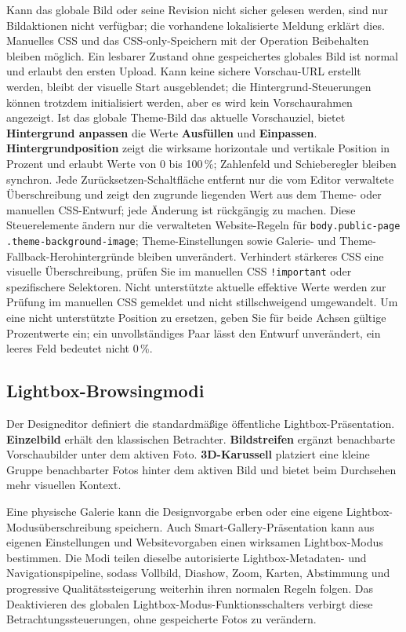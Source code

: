 \documentclass[11pt,a4paper]{article}
\newcommand{\ui}[1]{\textbf{#1}}
\newcommand{\codeword}[1]{\nolinkurl{#1}}
\begin{document}
Kann das globale Bild oder seine Revision nicht sicher gelesen werden, sind nur
Bildaktionen nicht verfügbar; die vorhandene lokalisierte Meldung erklärt dies.
Manuelles CSS und das CSS-only-Speichern mit der Operation Beibehalten bleiben
möglich. Ein lesbarer Zustand ohne gespeichertes globales Bild ist normal und
erlaubt den ersten Upload. Kann keine sichere Vorschau-URL erstellt werden,
bleibt der visuelle Start ausgeblendet; die Hintergrund-Steuerungen können
trotzdem initialisiert werden, aber es wird kein Vorschaurahmen angezeigt.
Ist das globale Theme-Bild das aktuelle Vorschauziel, bietet \ui{Hintergrund
anpassen} die Werte \ui{Ausfüllen} und \ui{Einpassen}. \ui{Hintergrundposition}
zeigt die wirksame horizontale und vertikale Position in Prozent und erlaubt
Werte von 0 bis 100\,\%; Zahlenfeld und Schieberegler bleiben synchron. Jede
Zurücksetzen-Schaltfläche entfernt nur die vom Editor verwaltete Überschreibung
und zeigt den zugrunde liegenden Wert aus dem Theme- oder manuellen CSS-Entwurf;
jede Änderung ist rückgängig zu machen. Diese Steuerelemente ändern nur die
verwalteten Website-Regeln für
\codeword{body.public-page .theme-background-image}; Theme-Einstellungen sowie
Galerie- und Theme-Fallback-Herohintergründe bleiben unverändert. Verhindert
stärkeres CSS eine visuelle Überschreibung, prüfen Sie im manuellen CSS
\codeword{!important} oder spezifischere Selektoren. Nicht unterstützte aktuelle
effektive Werte werden zur Prüfung im manuellen CSS gemeldet und nicht
stillschweigend umgewandelt. Um eine nicht unterstützte Position zu ersetzen,
geben Sie für beide Achsen gültige Prozentwerte ein; ein unvollständiges Paar
lässt den Entwurf unverändert, ein leeres Feld bedeutet nicht 0\,\%.
\subsection{Lightbox-Browsingmodi}

Der Designeditor definiert die standardmäßige öffentliche Lightbox-Präsentation.
\ui{Einzelbild} erhält den klassischen Betrachter. \ui{Bildstreifen} ergänzt
benachbarte Vorschaubilder unter dem aktiven Foto. \ui{3D-Karussell} platziert
eine kleine Gruppe benachbarter Fotos hinter dem aktiven Bild und bietet beim
Durchsehen mehr visuellen Kontext.

Eine physische Galerie kann die Designvorgabe erben oder eine eigene
Lightbox-Modus\-über\-schrei\-bung speichern. Auch Smart-Gallery-Präsentation
kann aus eigenen Einstellungen und Websitevorgaben einen wirksamen
Lightbox-Modus bestimmen. Die Modi teilen dieselbe autorisierte
Lightbox-Metadaten- und Navigationspipeline, sodass Vollbild, Diashow, Zoom,
Karten, Abstimmung und progressive Qualitätssteigerung weiterhin ihren normalen
Regeln folgen. Das Deaktivieren des globalen Lightbox-Modus-Funktionsschalters
verbirgt diese Betrachtungssteuerungen, ohne gespeicherte Fotos zu verändern.
\end{document}
